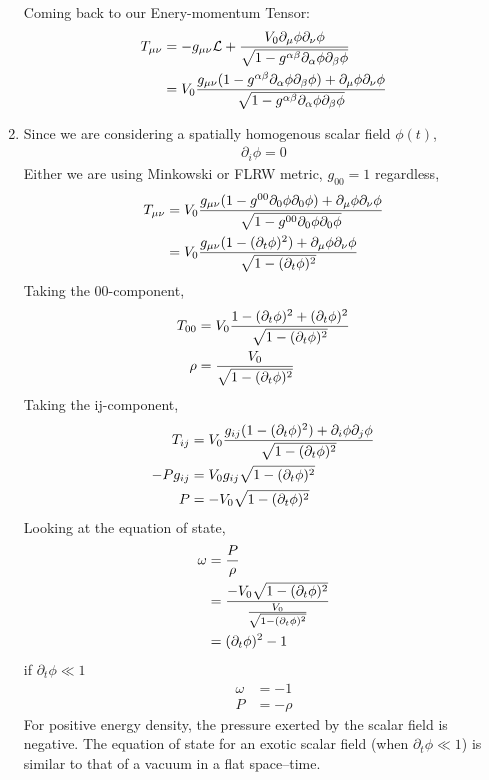 \begin{enumerate}[label=(\alph*)]
Coming back to our Enery-momentum Tensor:
\begin{align}
	T_{\mu\nu} 	&= -g_{\mu\nu} \mathcal{L} + \frac{V_0 \partial_\mu \phi \partial_\nu \phi}{\sqrt{1-g^{\alpha\beta} \partial_\alpha \phi \partial_\beta \phi }}   \notag \\
				&= V_0\frac{ g_{\mu\nu}(1-g^{\alpha\beta} \partial_\alpha \phi \partial_\beta \phi) + \partial_\mu \phi \partial_\nu \phi}{\sqrt{1-g^{\alpha\beta} \partial_\alpha \phi \partial_\beta \phi }}
\end{align}
\item
Since we are considering a spatially homogenous scalar field $\phi(t)$, 
\begin{align}
\partial_i \phi =0
\end{align}
Either we are using Minkowski or FLRW metric, $g_{00} = 1$ regardless, 
\begin{align}
	T_{\mu\nu}	&= V_0 \frac{ g_{\mu\nu} (1-g^{00} \partial_0 \phi \partial_0 \phi ) + \partial_\mu \phi \partial_\nu \phi }{\sqrt{1-g^{00} \partial_0 \phi \partial_0 \phi }} \notag \\
				&= V_0 \frac{ g_{\mu\nu} (1-(\partial_t \phi)^2) + \partial_\mu \phi \partial_\nu \phi }{\sqrt{1- (\partial_t \phi)^2}} 
\end{align}
Taking the 00-component,
\begin{align}
	T_{00}		&= V_0 \frac{1-(\partial_t \phi)^2 + (\partial_t \phi)^2}{\sqrt{1- (\partial_t \phi)^2}} \notag	\\
	\rho		&= \frac{V_0 }{\sqrt{1- (\partial_t \phi)^2}} 
\end{align}
Taking the ij-component,
\begin{align}
	T_{ij}	&= V_0 \frac{ g_{ij} (1-(\partial_t \phi)^2) + \partial_i \phi \partial_j \phi }{\sqrt{1- (\partial_t \phi)^2}} \notag \\
	-Pg_{ij}	&= V_0 g_{ij} \sqrt{1- (\partial_t \phi)^2} \notag \\
	P 		&= -V_0 \sqrt{1- (\partial_t \phi)^2} 
\end{align}
Looking at the equation of state,
\begin{align}
\omega 	&= \frac{P}{\rho}\\
		&=	\frac{-V_0 \sqrt{1- (\partial_t \phi)^2}}{\frac{V_0 }{\sqrt{1- (\partial_t \phi)^2}} } \notag \\
		&=	(\partial_t \phi)^2 -1
\end{align}
if $\partial_t \phi \ll 1$
\begin{align}
	\omega		&=	 -1	\\
	P 			&=	 -\rho 
\end{align}
For positive energy density, the pressure exerted by the scalar field is negative.
The equation of state for an exotic scalar field (when $\partial_t \phi \ll 1$) is similar to that of a vacuum in a flat space–time. 
\end{enumerate}

